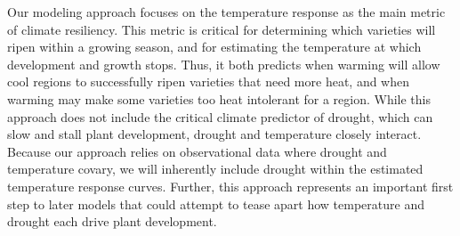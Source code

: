 \documentclass[11pt,letter,oneside]{article}
\begin{document}


Our modeling approach focuses on the temperature response as the main metric of climate resiliency. This metric is critical for determining which varieties will ripen within a growing season, and for estimating the temperature at which development and growth stops. Thus, it both predicts when warming will allow cool regions to successfully ripen varieties that need more heat, and when warming may make some varieties too heat intolerant for a region. While this approach does not include the critical climate predictor of drought, which can slow and stall plant development, drought and temperature closely interact. Because our approach relies on observational data where drought and temperature covary, we will inherently include drought within the estimated temperature response curves. Further, this approach represents an important first step to later models that could attempt to tease apart how temperature and drought each drive plant development. 
\end{document}
